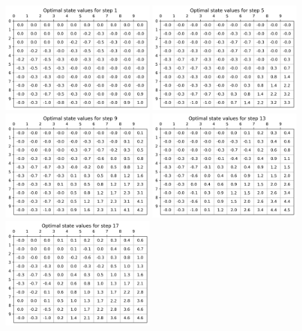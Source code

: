 \begin{figure}[!htb]
\centering
  \includegraphics[width=0.49\textwidth]{images/Q1-9/Optimal-state-values-for-step-1.png}
  \includegraphics[width=0.49\textwidth]{images/Q1-9/Optimal-state-values-for-step-5.png}
  \includegraphics[width=0.49\textwidth]{images/Q1-9/Optimal-state-values-for-step-9.png}
  \includegraphics[width=0.49\textwidth]{images/Q1-9/Optimal-state-values-for-step-13.png}
  \includegraphics[width=0.49\textwidth]{images/Q1-9/Optimal-state-values-for-step-17.png}

\end{figure}
